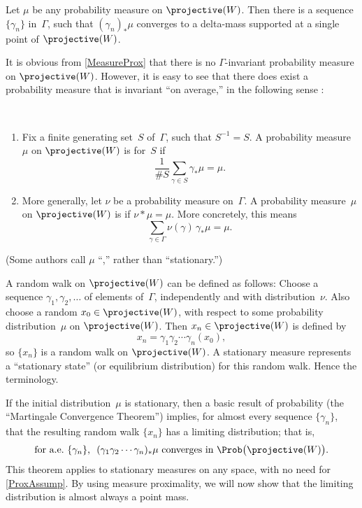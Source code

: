 \begin{prop} \label{MeasureProx}
Let $\mu$ be any probability measure on\/ $\projective(W)$. Then there is a sequence\/ $\{\gamma_n\}$ in\/~$\Gamma$, such that\/ $(\gamma_n)_*\mu$ converges to a delta-mass supported at a single point of\/ $\projective(W)$.
\end{prop}

It is obvious from \cref{MeasureProx} that there is no $\Gamma$-invariant probability measure on $\projective(W)$. However, it is easy to see that there does exist a probability measure that is invariant ``on average\zz,'' in the following sense :

\begin{defn} \ 
\noprelistbreak
\begin{enumerate}
\item Fix a finite generating set~$S$ of~$\Gamma$, such that $S^{-1} = S$. A probability measure~$\mu$ on $\projective(W)$ is  for~$S$ if 
	$$ \frac{1}{\#S} \sum_{\gamma \in S} \gamma_* \mu = \mu .$$
\item More generally, let $\nu$ be a probability measure on~$\Gamma$.
 A probability measure~$\mu$ on $\projective(W)$ is  if $\nu * \mu = \mu$. More concretely, this means
	$$  \sum_{\gamma \in \Gamma} \nu(\gamma) \, \gamma_* \mu = \mu .$$
\end{enumerate}
(Some authors call $\mu$ ``\zz,'' rather than ``stationary\zz.'')
\end{defn}

\begin{rem}
A random walk on $\projective(W)$ can be defined as follows: Choose a sequence $\gamma_1,\gamma_2, \ldots$ of elements of~$\Gamma$, independently and with distribution~$\nu$. Also choose a random $x_0 \in \projective(W)$, with respect to some probability distribution~$\mu$ on $\projective(W)$. Then $x_n \in \projective(W)$ is defined  by 
	$$x_n = \gamma_1 \gamma_2 \cdots \gamma_n(x_0) ,$$
so $\{x_n\}$ is a random walk on $\projective(W)$.
A stationary measure represents a ``stationary state'' (or equilibrium distribution) for this random walk. Hence the terminology.  
\end{rem}

If the initial distribution~$\mu$ is stationary, then a basic result of probability (the ``Martingale Convergence Theorem'') implies, for almost every sequence $\{\gamma_n\}$, that the resulting random walk $\{x_n\}$ has a limiting distribution; that is, 
	$$ \text{for a.e.\ $\{\gamma_n\}$, \ $(\gamma_1 \gamma_2 \cdots \gamma_n)_*\mu$ converges in 
$\Prob \bigl( \projective(W) \bigr)$}. $$
This theorem applies to stationary measures on any space, with no need for \cref{ProxAssump}. By using measure proximality, we will now show that the limiting distribution is almost always a point mass.


